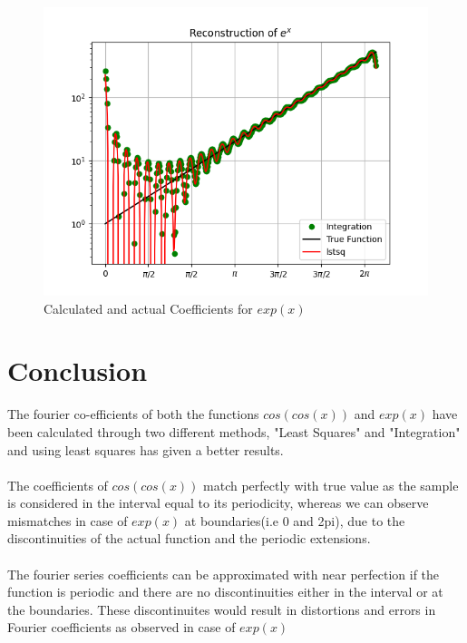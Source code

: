 \documentclass[11pt, a4paper]{article}
\begin{document}
            \begin{figure}[H]
                \centering
                \includegraphics[scale=0.9]{Figure 8.png}
                \caption{Calculated and actual Coefficients for $exp(x)$}                
            \end{figure}
                     
    \section{Conclusion}
      The fourier co-efficients of both the functions ${cos(cos(x))}$ and ${exp(x)}$ have been calculated through two different methods, "Least Squares" and "Integration" and using least squares has given a better results.\\
      \\The coefficients of $cos(cos(x))$ match perfectly with true value as the sample is considered in the interval equal to its periodicity, whereas we can observe mismatches in case of $exp(x)$ at boundaries(i.e 0 and 2pi), due to the discontinuities of the actual function and the periodic extensions.\\
     \\
      The fourier series coefficients can be approximated with near perfection if the function is periodic and there are no discontinuities either in the interval or at the boundaries. These discontinuites would result in distortions and errors in Fourier coefficients as observed in case of $exp(x)$
\end{document}
